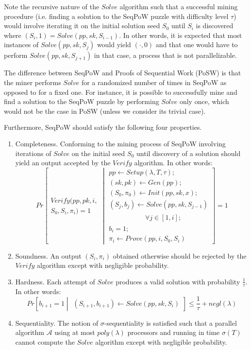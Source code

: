 \documentclass[letterpaper,twocolumn,10pt]{article}
\theoremstyle{definition}
\theoremstyle{remark}
\begin{document}
Note the recursive nature of the $Solve$ algorithm such that a successful mining procedure (i.e. finding a solution to the SeqPoW puzzle with difficulty level $\tau$) would involve iterating it on the initial solution seed $S_0$ until $S_i$ is discovered where $(S_i, 1) = Solve(pp, sk, S_{i - 1})$. In other words, it is expected that most instances of $Solve(pp, sk, S_j)$ would yield $(\cdot, 0)$ and that one would have to perform $Solve(pp, sk, S_{j + 1})$ in that case, a process that is not parallelizable.

The difference between SeqPoW and Proofs of Sequential Work (PoSW) \cite{mahmoody2013publicly,cohen2018simple} is that the miner performs $Solve$ for a randomized number of times in SeqPoW as opposed to for a fixed one. For instance, it is possible to successfully mine and find a solution to the SeqPoW puzzle by performing $Solve$ only once, which would not be the case in PoSW (unless we consider its trivial case).

Furthermore, SeqPoW should satisfy the following four properties.
\begin{enumerate}
\item Completeness. Conforming to the mining process of SeqPoW involving iterations of $Solve$ on the initial seed $S_0$ until discovery of a solution should yield an output accepted by the $Verify$ algorithm. In other words:
\begingroup\makeatletter\def\f@size{8}\check@mathfonts
\[
Pr\left[\begin{array}{l}Verify(pp, pk, i,\\S_0, S_i, \pi_i) = 1\end{array} \middle\vert \begin{array}{l}
pp \leftarrow Setup(\lambda, T, \tau);\\
(sk, pk) \leftarrow Gen(pp);\\
(S_0, \pi_0) \leftarrow Init(pp, sk, x);\\
(S_j, b_j) \leftarrow Solve(pp, sk, S_{j - 1})\\
\phantom{(S_j, b_j) XY} \forall j \in [1, i];\\
b_i = 1;\\
\pi_i \leftarrow Prove(pp, i, S_0, S_i)
\end{array}\right] = 1
\]\endgroup
\item Soundness. An output $(S_i, \pi_i)$ obtained otherwise should be rejected by the $Verify$ algorithm except with negligible probability.
\item Hardness. Each attempt of $Solve$ produces a valid solution with probability $\frac{1}{\tau}$. In other words:
\begingroup\makeatletter\def\f@size{8}\check@mathfonts
\[
Pr\left[b_{i + 1} = 1 \middle\vert \begin{array}{l}
(S_{i + 1}, b_{i + 1}) \leftarrow Solve(pp, sk, S_i)
\end{array}\right] \leq \frac{1}{\tau} + negl(\lambda)
\]\endgroup
\item Sequentiality. The notion of $\sigma$-sequentiality \cite{boneh2018verifiable} is satisfied such that a parallel algorithm $\mathcal{A}$ using at most $poly(\lambda)$ processors and running in time $\sigma(T)$ cannot compute the $Solve$ algorithm except with negligible probability.
\end{enumerate}
\end{document}
